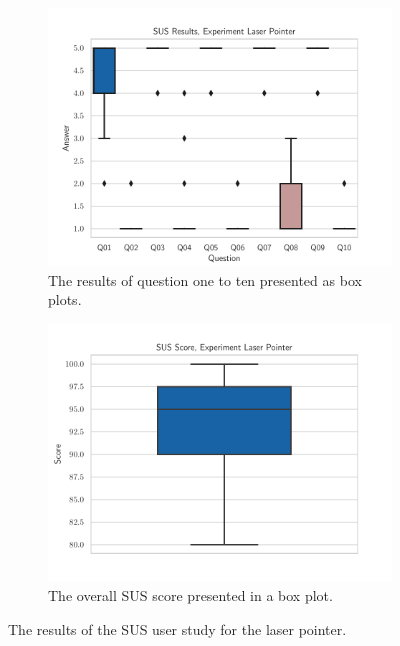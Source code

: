 



\begin{figure}[H]
  \centering
  \begin{subfigure}{.45\textwidth}%
    \centering
    \includegraphics[width=\textwidth]{figures/evaluation/res_exp_lp.pdf}
    \caption{The results of question one to ten presented as box plots.}\label{fig:res-exp-lp}
  \end{subfigure}%
  \hspace{0.1\textwidth}%
  \begin{subfigure}{.45\textwidth}%
    \centering
    \includegraphics[width=\textwidth]{figures/evaluation/score_exp_lp.pdf}
    \caption{The overall \ac{SUS} score presented in a box plot.}\label{fig:score-exp-lp}
  \end{subfigure}%
  \caption[User study results of the laser pointer experiment]{The results of the \ac{SUS} user study for the laser pointer.}\label{fig:exp-lp-stats}
\end{figure}


